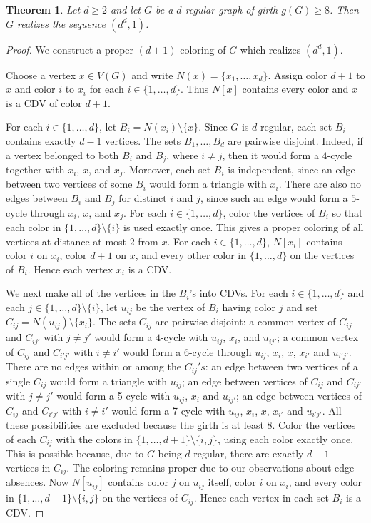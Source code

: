 \documentclass{article}
\newtheorem{theorem}{Theorem}[section]
\theoremstyle{definition}
\begin{document}
\begin{theorem}\label{t:girth8}
Let $d\geq 2$ and let $G$ be a $d$-regular graph of girth $g(G)\ge 8$.
Then $G$ realizes the sequence $(d^d,1)$.    
\end{theorem}

\begin{proof}
We construct a proper $(d+1)$-coloring of $G$ which realizes $(d^d,1)$.

Choose a vertex $x\in V(G)$ and write $N(x)=\{x_1,\ldots,x_d\}$. Assign color $d+1$ to $x$ and color $i$ to $x_i$ for each $i\in\{1,\ldots,d\}$. Thus $N[x]$ contains every color and $x$ is a CDV of color $d+1$. 

For each $i\in\{1,\ldots,d\}$, let $B_i=N(x_i)\setminus\{x\}$. Since $G$ is $d$-regular, each set $B_i$ contains exactly $d-1$ vertices. The sets $B_1,\ldots,B_d$ are pairwise disjoint. Indeed, if a vertex belonged to both $B_i$ and $B_j$, where $i\neq j$, then it would form a $4$-cycle together with $x_i$, $x$, and $x_j$. Moreover, each set $B_i$ is independent, since an edge between two vertices of some $B_i$ would form a triangle with $x_i$. There are also no edges between $B_i$ and $B_j$ for distinct $i$ and $j$, since such an edge would form a $5$-cycle through $x_i$, $x$, and $x_j$. For each $i\in\{1,\ldots,d\}$, color the vertices of $B_i$ so that each color in $\{1,\ldots,d\}\setminus\{i\}$ is used exactly once. This gives a proper coloring of all vertices at distance at most $2$ from $x$. For each $i\in\{1,\ldots,d\}$, $N[x_i]$ contains color $i$ on $x_i$, color $d+1$ on $x$, and every other color in $\{1,\ldots,d\}$ on the vertices of $B_i$. Hence each vertex $x_i$ is a CDV.

We next make all of the vertices in the $B_i$'s into CDVs. 
For each $i\in\{1,\ldots,d\}$ and each $j\in\{1,\ldots,d\}\setminus\{i\}$, let $u_{ij}$ be the vertex of $B_i$ having color $j$ and set $C_{ij}=N(u_{ij})\setminus\{x_i\}$.
The sets $C_{ij}$ are pairwise disjoint:
a common vertex of $C_{ij}$ and $C_{ij'}$ with $j\neq j'$ would form a $4$-cycle with $u_{ij}$, $x_i$, and $u_{ij'}$;
a common vertex of $C_{ij}$ and $C_{i'j'}$ with $i\neq i'$ would form a 6-cycle through $u_{ij}$, $x_i$, $x$, $x_{i'}$ and $u_{i'j'}$.
There are no edges within or among the $C_{ij}'s$:
an edge between two vertices of a single $C_{ij}$ would form a triangle with $u_{ij}$;
an edge between vertices of $C_{ij}$ and $C_{ij'}$ with $j\neq j'$ would form a 5-cycle with $u_{ij}$, $x_i$ and $u_{ij'}$;
an edge between vertices of $C_{ij}$ and $C_{i'j'}$ with $i\neq i'$ would form a 7-cycle with $u_{ij}$, $x_i$, $x$, $x_{i'}$ and $u_{i'j'}$.
All these possibilities are excluded because the girth is at least $8$.
Color the vertices of each $C_{ij}$ with the colors in $\{1,\ldots,d+1\}\setminus\{i,j\}$, using each color exactly once.
This is possible because, due to $G$ being $d$-regular, there are exactly $d-1$ vertices in $C_{ij}$.
The coloring remains proper due to our observations about edge absences.
Now $N[u_{ij}]$ contains color $j$ on $u_{ij}$ itself, color $i$ on $x_i$, and every color in $\{1,\ldots,d+1\}\setminus\{i,j\}$ on the vertices of $C_{ij}$.
Hence each vertex in each set $B_i$ is a CDV.


\end{proof}
\end{document}
